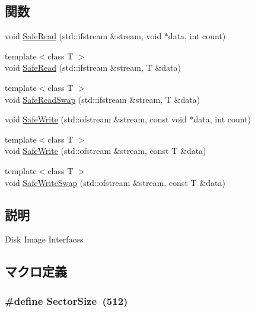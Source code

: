 \subsection*{関数}
\begin{DoxyCompactItemize}
\item 
void \hyperlink{disk__image_8hh_aecc27cfca6f4c839b8b7b2e7c23ee16d}{SafeRead} (std::ifstream \&stream, void $\ast$data, int count)
\item 
{\footnotesize template$<$class T $>$ }\\void \hyperlink{disk__image_8hh_a1feac840a0ac7b5b5ae0fc32262033f3}{SafeRead} (std::ifstream \&stream, T \&data)
\item 
{\footnotesize template$<$class T $>$ }\\void \hyperlink{disk__image_8hh_a6fcf5e92faf89d4d81045525f0cdb505}{SafeReadSwap} (std::ifstream \&stream, T \&data)
\item 
void \hyperlink{disk__image_8hh_a34c4ee1ddfb0f2ef17e6d2275999f7d1}{SafeWrite} (std::ofstream \&stream, const void $\ast$data, int count)
\item 
{\footnotesize template$<$class T $>$ }\\void \hyperlink{disk__image_8hh_ae71db8488b0a70f2e3b31ee29f45caf8}{SafeWrite} (std::ofstream \&stream, const T \&data)
\item 
{\footnotesize template$<$class T $>$ }\\void \hyperlink{disk__image_8hh_a2c4a168c945c58afd3c1bbd6925f1aa0}{SafeWriteSwap} (std::ofstream \&stream, const T \&data)
\end{DoxyCompactItemize}


\subsection{説明}
Disk Image Interfaces 

\subsection{マクロ定義}
\hypertarget{disk__image_8hh_ac729b32bca4535899ef2ee58b6a13d68}{
\subsubsection[{SectorSize}]{\setlength{\rightskip}{0pt plus 5cm}\#define SectorSize~(512)}}
\label{disk__image_8hh_ac729b32bca4535899ef2ee58b6a13d68}


